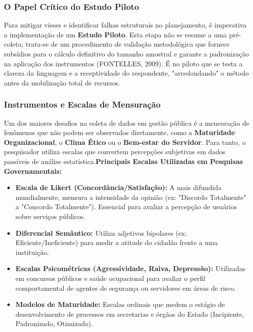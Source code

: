 \newpage
\subsubsection{O Papel Crítico do Estudo Piloto}

Para mitigar vieses e identificar falhas estruturais no planejamento, é imperativa a implementação de um \textbf{Estudo Piloto}. Esta etapa não se resume a uma pré-coleta; trata-se de um procedimento de validação metodológica que fornece subsídios para o cálculo definitivo do tamanho amostral e garante a padronização na aplicação dos instrumentos (FONTELLES, 2009). É no piloto que se testa a clareza da linguagem e a receptividade do respondente, "arredondando" o método antes da mobilização total de recursos.

\subsubsection{Instrumentos e Escalas de Mensuração}

Um dos maiores desafios na coleta de dados em gestão pública é a mensuração de fenômenos que não podem ser observados diretamente, como a \textbf{Maturidade Organizacional}, o \textbf{Clima Ético} ou o \textbf{Bem-estar do Servidor}. Para tanto, o pesquisador utiliza escalas que convertem percepções subjetivas em dados passíveis de análise estatística.\textbf{Principais Escalas Utilizadas em Pesquisas Governamentais:}

\begin{itemize}
\item \textbf{Escala de Likert (Concordância/Satisfação):} A mais difundida mundialmente, mensura a intensidade da opinião (ex: "Discordo Totalmente" a "Concordo Totalmente"). Essencial para avaliar a percepção de usuários sobre serviços públicos.
\item \textbf{Diferencial Semântico:} Utiliza adjetivos bipolares (ex: Eficiente/Ineficiente) para medir a atitude do cidadão frente a uma instituição.
\item \textbf{Escalas Psicométricas (Agressividade, Raiva, Depressão):} Utilizadas em concursos públicos e saúde ocupacional para avaliar o perfil comportamental de agentes de segurança ou servidores em áreas de risco.
\item \textbf{Modelos de Maturidade:} Escalas ordinais que medem o estágio de desenvolvimento de processos em secretarias e órgãos do Estado (Incipiente, Padronizado, Otimizado).
\end{itemize}

